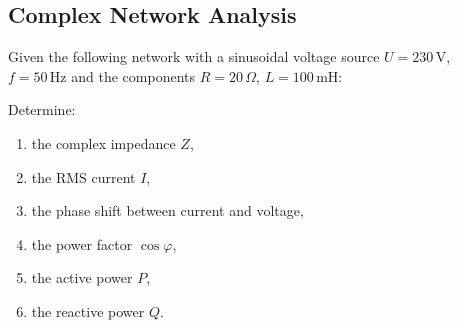 \documentclass[a4paper,12pt]{article}
\newif\ifshowsolutions
\begin{document}
\ifshowsolutions
Solution:
\[
\underline{Z}_R = R
\]
\[
\underline{Z}_L = j \omega L = j \cdot 1000 \cdot 0.05 = j50\,\Omega
\]
\[
\underline{Z}_C = \frac{1}{j \omega C} = \frac{1}{j \cdot 1000 \cdot 100 \cdot 10^{-6}} = -j10\,\Omega
\]
\[
\underline{Z}_{LC} = \left( \frac{1}{Z_L} + \frac{1}{Z_C} \right)^{-1} = \frac{1}{j0.08} = -j12.5\,\Omega
\]
\[
\underline{Z} = R_1 + Z_{LC} + R_2 = (30 - j12.5)\,\Omega
\]
\[
|\underline{Z}| = \sqrt{30^2 + 12.5^2} \approx 32.5\,\Omega
\]
\[
\varphi = \arctan\left(\frac{-12.5}{30}\right) \approx -22.6^\circ
\]
\fi

\subsection{Complex Network Analysis}

Given the following network with a sinusoidal voltage source $U = 230\,\mathrm{V}$, $f = 50\,\mathrm{Hz}$ and the components $R = 20\,\Omega$, $L = 100\,\mathrm{mH}$:

\begin{center}
\end{center}

Determine:

\begin{enumerate}
  \item the complex impedance $Z$,
  \item the RMS current $I$,
  \item the phase shift between current and voltage,
  \item the power factor $\cos\varphi$,
  \item the active power $P$,
  \item the reactive power $Q$.
\end{enumerate}

\ifshowsolutions
Solution:
\[
\omega = 2\pi f = 314\,\text{rad/s}
\]
\[
X_L = \omega L = 31.4\,\Omega
\]
\[
\underline{Z} = (20 + j31.4)\,\Omega \Rightarrow |\underline{Z}| = 37.2\,\Omega
\]
\[
I = \frac{230}{37.2} = 6.18\,\text{A}
\]
\[
\varphi = \arctan\left(\frac{31.4}{20}\right) = 57.5^\circ
\]
\[
\cos\varphi = 0.54
\]
\[
P = U I \cos\varphi = 764\,\text{W}
\]
\[
Q = U I \sin\varphi = 1199\,\text{VAR}
\]
\fi
\end{document}
